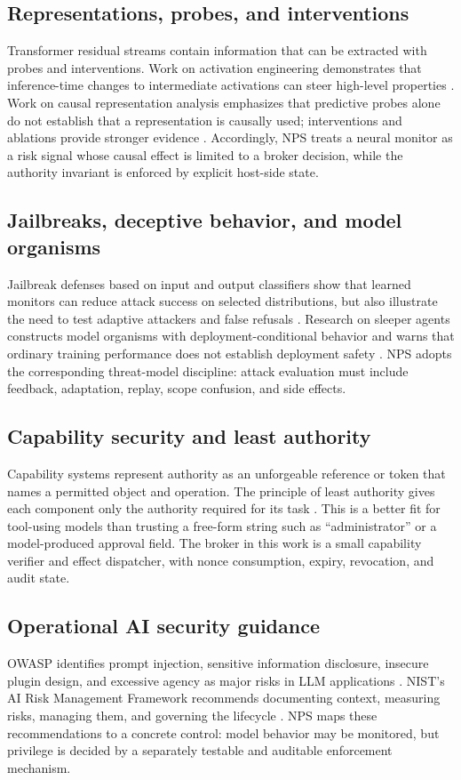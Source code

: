 \documentclass[11pt]{article}
\newcommand{\1}{\mathbf{1}}
\begin{document}
\subsection{Representations, probes, and interventions}
Transformer residual streams contain information that can be extracted with probes and interventions. Work on activation engineering demonstrates that inference-time changes to intermediate activations can steer high-level properties \cite{turner2023activation}. Work on causal representation analysis emphasizes that predictive probes alone do not establish that a representation is causally used; interventions and ablations provide stronger evidence \cite{elhage2022toy}. Accordingly, NPS treats a neural monitor as a risk signal whose causal effect is limited to a broker decision, while the authority invariant is enforced by explicit host-side state.

\subsection{Jailbreaks, deceptive behavior, and model organisms}
Jailbreak defenses based on input and output classifiers show that learned monitors can reduce attack success on selected distributions, but also illustrate the need to test adaptive attackers and false refusals \cite{anthropic2025cc}. Research on sleeper agents constructs model organisms with deployment-conditional behavior and warns that ordinary training performance does not establish deployment safety \cite{hubinger2024sleeper}. NPS adopts the corresponding threat-model discipline: attack evaluation must include feedback, adaptation, replay, scope confusion, and side effects.

\subsection{Capability security and least authority}
Capability systems represent authority as an unforgeable reference or token that names a permitted object and operation. The principle of least authority gives each component only the authority required for its task \cite{miller2006robust}. This is a better fit for tool-using models than trusting a free-form string such as ``administrator'' or a model-produced approval field. The broker in this work is a small capability verifier and effect dispatcher, with nonce consumption, expiry, revocation, and audit state.

\subsection{Operational AI security guidance}
OWASP identifies prompt injection, sensitive information disclosure, insecure plugin design, and excessive agency as major risks in LLM applications \cite{owasp2025top10}. NIST's AI Risk Management Framework recommends documenting context, measuring risks, managing them, and governing the lifecycle \cite{tabassi2023airmf}. NPS maps these recommendations to a concrete control: model behavior may be monitored, but privilege is decided by a separately testable and auditable enforcement mechanism.
\end{document}
